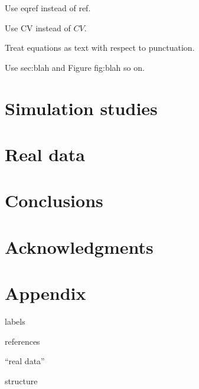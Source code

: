 Use eqref instead of ref.

Use $\text{CV}$ instead of $CV$.

Treat equations as text with respect to punctuation.

Use sec:blah and Figure fig:blah so on.

\section{Simulation studies}
\label{sec:sim}



\section{Real data}

\section{Conclusions}

\section*{Acknowledgments}

\section*{Appendix}

labels

references

``real data''

structure

